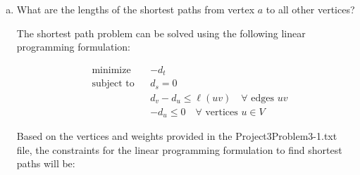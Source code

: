 \documentclass[../report/main.tex]{subfiles}
\begin{document}
\begin{enumerate}[a)]
	\item What are the lengths of the shortest paths from vertex $a$ to all other vertices?

    The shortest path problem can be solved using the following linear programming formulation:

  \begin{equation*}
    \begin{aligned}
      & \text{minimize} & & -d_t \\
      & \text{subject to} & & d_s = 0 \\
      & & & d_v - d_u \leq \ell(uv) \quad \forall \text{ edges } uv \\
      & & & -d_u \leq 0 \quad \forall \text{ vertices } u \in V
    \end{aligned}
  \end{equation*}

  Based on the vertices and weights provided in the Project3Problem3-1.txt file, the constraints for the linear programming formulation to find shortest paths will be:


\end{enumerate}
\end{document}
